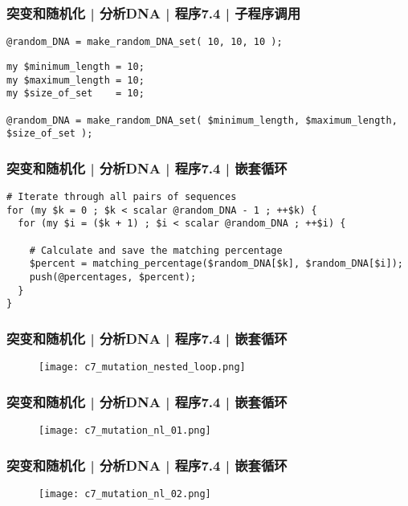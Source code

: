 \begin{frame}[fragile]
  \frametitle{突变和随机化 | 分析DNA | 程序7.4 | 子程序调用}
\begin{lstlisting}
@random_DNA = make_random_DNA_set( 10, 10, 10 );
\end{lstlisting}
\pause
\begin{lstlisting}
my $minimum_length = 10;
my $maximum_length = 10;
my $size_of_set    = 10;

@random_DNA = make_random_DNA_set( $minimum_length, $maximum_length, $size_of_set );
\end{lstlisting}
\end{frame}

\begin{frame}[fragile]
  \frametitle{突变和随机化 | 分析DNA | 程序7.4 | \alert{嵌套循环}}
\begin{lstlisting}
# Iterate through all pairs of sequences
for (my $k = 0 ; $k < scalar @random_DNA - 1 ; ++$k) {
  for (my $i = ($k + 1) ; $i < scalar @random_DNA ; ++$i) {

    # Calculate and save the matching percentage
    $percent = matching_percentage($random_DNA[$k], $random_DNA[$i]);
    push(@percentages, $percent);
  }
}
\end{lstlisting}
\end{frame}

\begin{frame}
  \frametitle{突变和随机化 | 分析DNA | 程序7.4 | 嵌套循环}
  \begin{figure}
    \centering
    \texttt{[image: c7\_mutation\_nested\_loop.png]}
  \end{figure}
\end{frame}

\begin{frame}
  \frametitle{突变和随机化 | 分析DNA | 程序7.4 | 嵌套循环}
  \begin{figure}
    \centering
    \texttt{[image: c7\_mutation\_nl\_01.png]}
  \end{figure}
\end{frame}

\begin{frame}
  \frametitle{突变和随机化 | 分析DNA | 程序7.4 | 嵌套循环}
  \begin{figure}
    \centering
    \texttt{[image: c7\_mutation\_nl\_02.png]}
  \end{figure}
\end{frame}

